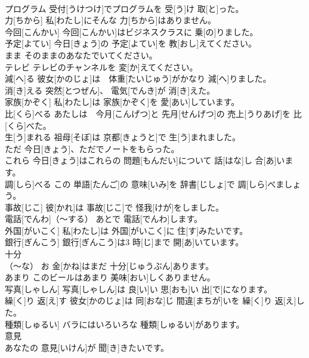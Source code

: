 \documentclass[8pt]{extreport}
\begin{document}
\begin{CJK}{UTF8}{min}
\\	プログラム	受付[うけつけ]でプログラムを 受[う]け 取[と]った。		
\\	力[ちから]	私[わたし]にそんな 力[ちから]はありません。		
\\	今回[こんかい]	今回[こんかい]はビジネスクラスに 乗[の]りました。		
\\	予定[よてい]	今日[きょう]の 予定[よてい]を 教[おし]えてください。		
\\	まま	そのままのあなたでいてください。		
\\	テレビ	テレビのチャンネルを 変[か]えてください。		
\\	減[へ]る	彼女[かのじょ]は　体重[たいじゅう]がかなり 減[へ]りました。		
\\	消[き]える	突然[とつぜん]、 電気[でんき]が 消[き]えた。		
\\	家族[かぞく]	私[わたし]は 家族[かぞく]を 愛[あい]しています。		
\\	比[くら]べる	あたしは　今月[こんげつ]と 先月[せんげつ]の 売上[うりあげ]を 比[くら]べた。		
\\	生[う]まれる	祖母[そぼ]は 京都[きょうと]で 生[う]まれました。		
\\	ただ	今日[きょう]、ただでノートをもらった。		
\\	これら	今日[きょう]はこれらの 問題[もんだい]について 話[はな]し 合[あ]います。		
\\	調[しら]べる	この 単語[たんご]の 意味[いみ]を 辞書[じしょ]で 調[しら]べましょう。		
\\	事故[じこ]	彼[かれ]は 事故[じこ]で 怪我[けが]をしました。		
\\	電話[でんわ]（～する）	あとで 電話[でんわ]します。		
\\	外国[がいこく]	私[わたし]は 外国[がいこく]に 住[す]みたいです。		
\\	銀行[ぎんこう]	銀行[ぎんこう]は3 時[じ]まで 開[あ]いています。		
\\	十分
\\	[じゅうぶん]（～な）	お 金[かね]はまだ 十分[じゅうぶん]あります。		
\\	あまり	このビールはあまり 美味[おい]しくありません。		
\\	写真[しゃしん]	写真[しゃしん]は 良[い]い 思[おも]い 出[で]になります。		
\\	繰[く]り 返[え]す	彼女[かのじょ]は 同[おな]じ 間違[まちが]いを 繰[く]り 返[え]した。		
\\	種類[しゅるい]	バラにはいろいろな 種類[しゅるい]があります。		
\\	意見
\\	[いけん]	あなたの 意見[いけん]が 聞[き]きたいです。		

\end{CJK}
\end{document}

